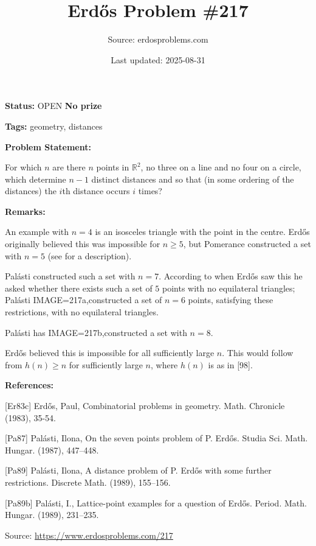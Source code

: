 \documentclass{article}
\title{Erd\H{o}s Problem \#217}
\date{Last updated: 2025-08-31}
\author{Source: erdosproblems.com}
\begin{document}
\maketitle

\noindent\textbf{Status:} OPEN \quad \textbf{No prize}

\noindent\textbf{Tags:} geometry, distances

\medskip
\noindent\textbf{Problem Statement:}

For which $n$ are there $n$ points in $\mathbb{R}^2$, no three on a line and no four on a circle, which determine $n-1$ distinct distances and so that (in some ordering of the distances) the $i$th distance occurs $i$ times?

\bigskip
\noindent\textbf{Remarks:}

An example with $n=4$ is an isosceles triangle with the point in the centre. Erd\H{o}s originally believed this was impossible for $n\geq 5$, but Pomerance constructed a set with $n=5$ (see \cite{Er83c} for a description). 

Pal\'{a}sti \cite{Pa87} constructed such a set with $n=7$. According to \cite{Pa89} when Erd\H{o}s saw this he asked whether there exists such a set of $5$ points with no equilateral triangles; Pal\'{a}sti \cite{Pa89} {IMAGE=217a,constructed a set} of $n=6$ points, satisfying these restrictions, with no equilateral triangles.

Pal\'{a}sti \cite{Pa89b} has {IMAGE=217b,constructed a set} with $n=8$.

Erd\H{o}s believed this is impossible for all sufficiently large $n$. This would follow from $h(n)\geq n$ for sufficiently large $n$, where $h(n)$ is as in [98].

\bigskip
\noindent\textbf{References:}

[Er83c] Erd\H{o}s, Paul, Combinatorial problems in geometry. Math. Chronicle (1983), 35-54.
 
 [Pa87] Pal\'{a}sti, Ilona, On the seven points problem of {P}. {E}rd\H os. Studia Sci. Math. Hungar. (1987), 447--448.
 
 [Pa89] Pal\'{a}sti, Ilona, A distance problem of {P}. {E}rd\H os with some further
restrictions. Discrete Math. (1989), 155--156.
 
 [Pa89b] Pal\'{a}sti, I., Lattice-point examples for a question of {E}rd\H os. Period. Math. Hungar. (1989), 231--235.

\bigskip
\noindent\small{Source: \url{https://www.erdosproblems.com/217}}
\end{document}
